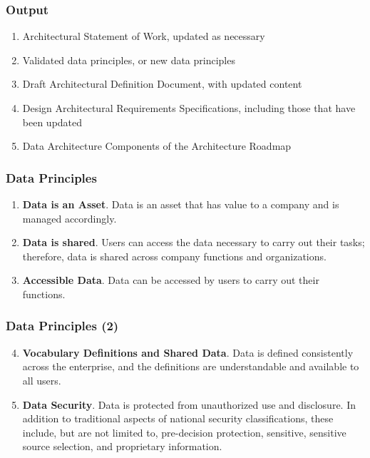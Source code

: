 \documentclass[aspectratio=169, table]{beamer}
\begin{document}
    \begin{frame}
        \frametitle{Output}
        \begin{enumerate}
            \item Architectural Statement of Work, updated as necessary
            \item Validated data principles, or new data principles
            \item Draft Architectural Definition Document, with updated content
            \item Design Architectural Requirements Specifications, including those that have been updated
            \item Data Architecture Components of the Architecture Roadmap
        \end{enumerate}
    \end{frame}

    \begin{frame}
        \frametitle{Data Principles}
        \begin{enumerate}
            \item \textbf{Data is an Asset}.
            Data is an asset that has value to a company and is managed accordingly.
            \item \textbf{Data is shared}.
            Users can access the data necessary to carry out their tasks; therefore, data is shared across company functions
            and organizations.
            \item \textbf{Accessible Data}. Data can be accessed by users to carry out their functions.
        \end{enumerate}
    \end{frame}

    \begin{frame}
        \frametitle{Data Principles (2)}
        \begin{enumerate}
            \setcounter{enumi}{3}
            \item \textbf{Vocabulary Definitions and Shared Data}. Data is defined consistently across the enterprise, and the definitions are understandable and available to all users.
            \item \textbf{Data Security}.
            Data is protected from unauthorized use and disclosure. In addition to traditional aspects of national security
            classifications, these include, but are not limited to, pre-decision protection, sensitive, sensitive source selection, and
            proprietary information.
        \end{enumerate}
    \end{frame}
\end{document}
